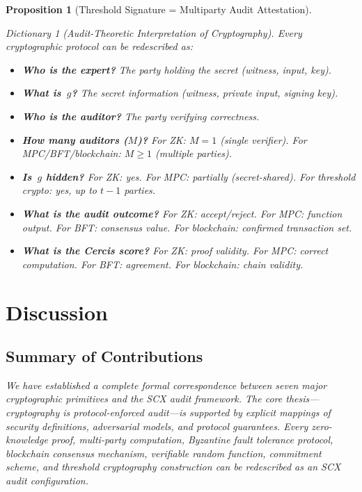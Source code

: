 \documentclass[12pt,a4paper]{article}
\newtheorem{proposition}[theorem]{Proposition}
\theoremstyle{remark}
\newtheorem{dictionary}[theorem]{Dictionary}
\newcommand{\SCX}{\textsf{SCX}}
\newcommand{\Cercis}{\textsf{Cercis}}
\begin{document}
\begin{proposition}[Threshold Signature = Multiparty Audit Attestation]
\begin{dictionary}[Audit-Theoretic Interpretation of Cryptography]
\label{dict:audit_interpretation}
Every cryptographic protocol can be redescribed as:
\begin{itemize}[leftmargin=*]
  \item \textbf{Who is the expert?} The party holding the secret (witness, input, key).
  \item \textbf{What is~$g$?} The secret information (witness, private input, signing key).
  \item \textbf{Who is the auditor?} The party verifying correctness.
  \item \textbf{How many auditors ($M$)?} For ZK: $M=1$ (single verifier). For MPC/BFT/blockchain: $M \geq 1$ (multiple parties).
  \item \textbf{Is~$g$ hidden?} For ZK: yes. For MPC: partially (secret-shared). For threshold crypto: yes, up to $t-1$ parties.
  \item \textbf{What is the audit outcome?} For ZK: accept/reject. For MPC: function output. For BFT: consensus value. For blockchain: confirmed transaction set.
  \item \textbf{What is the \Cercis{} score?} For ZK: proof validity. For MPC: correct computation. For BFT: agreement. For blockchain: chain validity.
\end{itemize}
\end{dictionary}


\section{Discussion}
\label{sec:discussion}

\subsection{Summary of Contributions}

We have established a complete formal correspondence between seven major cryptographic primitives and the \SCX{} audit framework. The core thesis---cryptography is protocol-enforced audit---is supported by explicit mappings of security definitions, adversarial models, and protocol guarantees. Every zero-knowledge proof, multi-party computation, Byzantine fault tolerance protocol, blockchain consensus mechanism, verifiable random function, commitment scheme, and threshold cryptography construction can be redescribed as an \SCX{} audit configuration.


\end{proposition}
\end{document}
